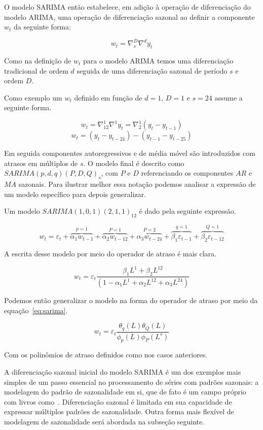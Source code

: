 O modelo SARIMA então estabelece, em adição à operação de diferenciação do
modelo ARIMA, uma operação de diferenciação sazonal ao definir a componente
$w_t$ da seguinte forma:

$$ w_t = \nabla^D_{s}\nabla^d  y_t $$

Como na definição de $w_t$ para o modelo ARIMA temos uma diferenciação
tradicional de ordem $d$ seguida de uma diferenciação sazonal de período $s$
e ordem $D$.

Como exemplo um $w_t$ definido em função de $d=1$, $D=1$ e $s=24$ assume a
seguinte forma.

$$ w_t =  \nabla^1_{12} \nabla^1 y_t = \nabla^1_{2} (y_t - y_{t-1}) $$
$$ w_t =  (y_t - y_{t-24}) - (y_{t-1} - y_{t-25}) $$

Em seguida componentes autoregressivos e de média móvel são introduzidos com
atrasos em múltiplos de $s$. O modelo final é descrito como $SARIMA(p, d, q)
(P, D, Q)_{s}$, com $P$ e $D$ referenciando os componentes $AR$ e $MA$
sazonais. Para ilustrar melhor essa notação podemos analisar a expressão de um
modelo específico para depois generalizar.

Um modelo $SARIMA(1, 0, 1)(2, 1, 1)_{12}$ é dado pela seguinte expressão.

$$ w_t = \varepsilon_t + \overbrace{\alpha_1 w_{t-1}}^{p = 1} + \overbrace{
\alpha_2 w_{t-12}}^{P=1} + \overbrace{\alpha_3 w_{t-24}}^{P=2} +
\overbrace{\beta_1 \varepsilon_{t-1}}^{q=1} + \overbrace{\beta_2
\varepsilon_{t-12}}^{Q=1}$$

A escrita desse modelo por meio do operador de atraso é mais clara.

$$  w_t = \varepsilon_t \frac{\beta_1 L^1 + \beta_2 L^{12}}{(1 - \alpha_1 L^1 + \alpha_2 L^{12} + \alpha_3 L^{24})}  $$

Podemos então generalizar o modelo na forma do operador de atraso por meio da
equação~\ref{eq:sarima}.

\begin{equation}\label{eq:sarima}
    w_t = \varepsilon_{t} \frac{\theta_q(L)\theta_Q(L)}{\phi_p (L) \phi_P (L^s)}
\end{equation}

Com os polinômios de atraso definidos como nos casos anteriores.

A diferenciação sazonal inicial do modelo SARIMA é um dos exemplos mais simples
de um passo essencial no processamento de séries com padrões sazonais: a
modelagem do padrão de sazonalidade em si, que de fato é um campo próprio com
livros como~\cite{x11}. Diferenciação sazonal é limitada em sua capacidade de
expressar múltiplos padrões de sazonalidade. Outra forma mais flexível de
modelagem de sazonalidade será abordada na subseção seguinte.

